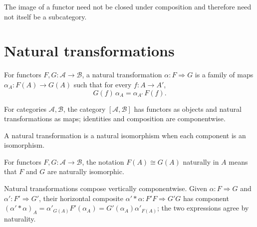 \begin{warning}
\label{warn:lbc-functor-image}
The image of a functor need not be closed under composition and therefore need
not itself be a subcategory.
\end{warning}

\section{Natural transformations}
\begin{definition}
\label{def:lbc-natural-transformation}
For functors $F,G:\mathcal A\to\mathcal B$, a natural transformation
$\alpha:F\Rightarrow G$ is a family of maps $\alpha_A:F(A)\to G(A)$ such that
for every $f:A\to A'$,
\[G(f)\,\alpha_A=\alpha_{A'}\,F(f).\]
\end{definition}

\begin{definition}
\label{con:lbc-functor-category}
For categories $\mathcal A,\mathcal B$, the category $[\mathcal A,\mathcal B]$
has functors as objects and natural transformations as maps; identities and
composition are componentwise.
\end{definition}

\begin{definition}
\label{def:lbc-natural-iso}
A natural transformation is a natural isomorphism when each component is an
isomorphism.
\end{definition}

\begin{definition}
\label{def:lbc-natural-in-object}
For functors $F,G:\mathcal A\to\mathcal B$, the notation
$F(A)\cong G(A)$ naturally in $A$ means that $F$ and $G$ are naturally
isomorphic.
\end{definition}

\begin{remark}
\label{rem:lbc-horizontal-composition}
Natural transformations compose vertically componentwise. Given
$\alpha:F\Rightarrow G$ and $\alpha':F'\Rightarrow G'$, their horizontal
composite $\alpha'\ast\alpha:F'F\Rightarrow G'G$ has component
$(\alpha'\ast\alpha)_A=\alpha'_{G(A)}F'(\alpha_A)=G'(\alpha_A)\alpha'_{F(A)}$;
the two expressions agree by naturality.
\end{remark}

